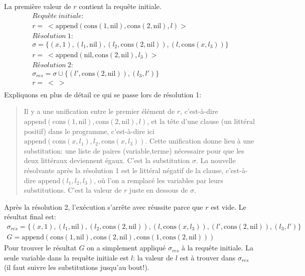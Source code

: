 La première valeur de $r$ contient la requête initiale.
\begin{equation}
\begin{array}{l}
\mathit{Requête\ initiale:} \\
r =\ < \mathrm{append}(\mathrm{cons}(1,\mathrm{nil}), \mathrm{cons}(2,\mathrm{nil}), l)> \\
\mathit{Résolution\ 1:} \\
\sigma = \{(x,1), (l_1,\mathrm{nil}), (l_2,\mathrm{cons}(2,\mathrm{nil})), (l,\mathrm{cons}(x,l_3))\} \\
r =\ < \mathrm{append}(\mathrm{nil}, \mathrm{cons}(2,\mathrm{nil}), l_3) > \\
\mathit{Résolution\ 2:} \\
\sigma_{res} = \sigma \cup \{ (l',\mathrm{cons}(2,\mathrm{nil})), (l_3,l') \} \\
r =\ <\ > \\
\end{array}
\end{equation}
Expliquons en plus de détail ce qui se passe lors de résolution 1:
\begin{quote}
Il y a une unification entre le premier élément de $r$,
c'est-à-dire $\mathrm{append}(\mathrm{cons}(1,\mathrm{nil}), \mathrm{cons}(2,\mathrm{nil}), l)$,
et la tête d'une clause (un littéral positif) dans le programme,
c'est-à-dire ici $\mathrm{append}(\mathrm{cons}(x,l_1),l_2,\mathrm{cons}(x,l_3))$.
Cette unification donne lieu à une substitution: une liste de paires (variable,terme)
nécessaire pour que les deux littéraux deviennent égaux.
C'est la substitution $\sigma$.
La nouvelle résolvante après la résolution 1 est le littéral négatif de la clause,
c'est-à-dire $\mathrm{append}(l_1,l_2,l_3)$, où l'on a remplacé les variables par leurs substitutions.
C'est la valeur de $r$ juste en dessous de $\sigma$.
\end{quote}
Après la résolution 2,
l'exécution s'arrête avec réussite parce que $r$ est vide.
Le résultat final est:
\begin{equation}
\begin{array}{l}
\sigma_{res} = \{(x,1), (l_1,\mathrm{nil}), (l_2,\mathrm{cons}(2,\mathrm{nil})), (l,\mathrm{cons}(x,l_3)), (l',\mathrm{cons}(2,\mathrm{nil})), (l_3,l') \} \\
G = \mathrm{append}(\mathrm{cons}(1,\mathrm{nil}), \mathrm{cons}(2,\mathrm{nil}), \mathrm{cons}(1,\mathrm{cons}(2,\mathrm{nil})))
\end{array}
\end{equation}
Pour trouver le résultat $G$ on a simplement appliqué $\sigma_{res}$ à la requête initiale.
La seule variable dans la requête initiale est $l$: la valeur de $l$ est à trouver dans $\sigma_{res}$
(il faut suivre les substitutions jusqu'au bout!).

